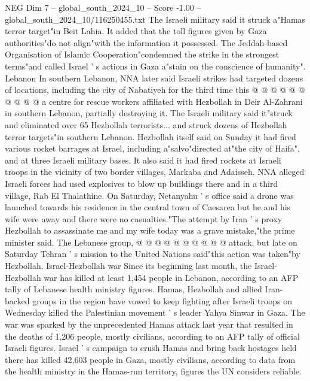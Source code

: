 \begin{textsample}{NEG Dim 7 – global\_south\_2024\_10 – Score -1.00 – global\_south\_2024\_10/116250455.txt}
The Israeli military said it struck a"Hamas terror target"in Beit Lahia.
It added that the toll figures given by Gaza authorities"do not align"with the information it possessed.
The Jeddah-based Organisation of Islamic Cooperation"condemned the strike in the strongest terms"and called Israel ' s actions in Gaza a"stain on the conscience of humanity".
Lebanon In southern Lebanon, NNA later said Israeli strikes had targeted dozens of locations, including the city of Nabatiyeh for the third time this @ @ @ @ @ @ @ @ @ @ a centre for rescue workers affiliated with Hezbollah in Deir Al-Zahrani in southern Lebanon, partially destroying it.
The Israeli military said it"struck and eliminated over 65 Hezbollah terrorists... and struck dozens of Hezbollah terror targets"in southern Lebanon.
Hezbollah itself said on Sunday it had fired various rocket barrages at Israel, including a"salvo"directed at"the city of Haifa", and at three Israeli military bases.
It also said it had fired rockets at Israeli troops in the vicinity of two border villages, Markaba and Adaisseh.
NNA alleged Israeli forces had used explosives to blow up buildings there and in a third village, Rab El Thalathine.
On Saturday, Netanyahu ' s office said a drone was launched towards his residence in the central town of Caesarea but he and his wife were away and there were no casualties."The attempt by Iran ' s proxy Hezbollah to assassinate me and my wife today was a grave mistake,"the prime minister said.
The Lebanese group, @ @ @ @ @ @ @ @ @ @ attack, but late on Saturday Tehran ' s mission to the United Nations said"this action was taken"by Hezbollah.
Israel-Hezbollah war Since its beginning last month, the Israel-Hezbollah war has killed at least 1,454 people in Lebanon, according to an AFP tally of Lebanese health ministry figures.
Hamas, Hezbollah and allied Iran-backed groups in the region have vowed to keep fighting after Israeli troops on Wednesday killed the Palestinian movement ' s leader Yahya Sinwar in Gaza.
The war was sparked by the unprecedented Hamas attack last year that resulted in the deaths of 1,206 people, mostly civilians, according to an AFP tally of official Israeli figures.
Israel ' s campaign to crush Hamas and bring back hostages held there has killed 42,603 people in Gaza, mostly civilians, according to data from the health ministry in the Hamas-run territory, figures the UN considers reliable.

\end{textsample}
